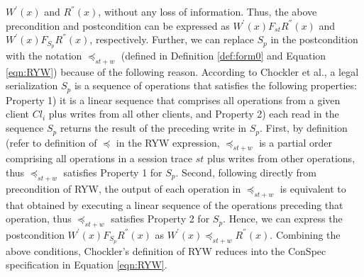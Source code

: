 \documentclass[journal,compsoc]{IEEEtran}
\begin{document}
   $W^{'}(x)$ and $R^{''}(x)$, without any loss of information. Thus, the above precondition and postcondition can be expressed as  $W^{'}(x) F_\mathit{st} R^{''}(x)$ and $W^{'}(x) F_{S_p}  R^{''}(x) $, respectively. Further, we can replace $S_p$ in the postcondition with the notation  $\preccurlyeq_{\mathit{st}+w}$ (defined in Definition \ref{def:form0} and Equation \ref{eqn:RYW}) because of the following reason.  According to Chockler et al., a legal serialization $S_p$ is a sequence of operations that satisfies the following properties: Property 1) it is a linear sequence that comprises all operations from a given client $\mathit{Cl}_i$ plus writes from all other clients, and Property 2) each read in the sequence $S_p$ returns the result of the preceding write in $S_p$.  First, by definition (refer to definition of $\preccurlyeq$ in the RYW expression, $\preccurlyeq_{\mathit{st}+w}$ is a partial order  comprising all operations in a session trace $\mathit{st}$ plus writes from other operations, thus $\preccurlyeq_{\mathit{st}+w}$ satisfies Property 1 for $S_p$. Second, following directly from precondition of RYW, the output of each operation in $\preccurlyeq_{\mathit{st}+w}$ is equivalent to that obtained by executing a linear sequence of the operations preceding that operation, thus $\preccurlyeq_{\mathit{st}+w}$ satisfies Property 2 for $S_p$. Hence, we can express the postcondition $W^{'}(x) F_{S_p} R^{''}(x) $ as  $W^{'}(x) \preccurlyeq_{\mathit{st}+w} R^{''}(x)$. Combining the above conditions, Chockler's definition of RYW reduces into the ConSpec specification in Equation \ref{eqn:RYW}.  %
\end{document}
